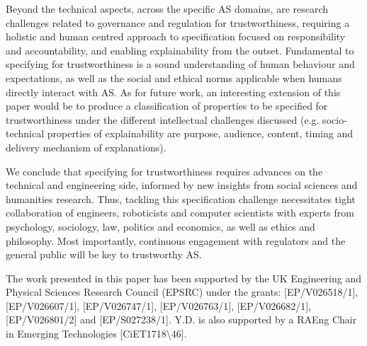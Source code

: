 \documentclass[sigconf,nonacm]{acmart}%
\begin{document}
	Beyond the technical aspects, across the specific AS domains, are research challenges related to governance and regulation for trustworthiness, requiring a holistic and human centred approach to specification focused on responsibility and accountability, and enabling explainability from the outset. 
	Fundamental to specifying for trustworthiness is a sound understanding of human behaviour and expectations, as well as the social and ethical norms applicable when humans directly interact with AS. 
	As for future work, an interesting extension of this paper would be to produce a classification of properties to be specified for trustworthiness under the different intellectual challenges discussed (e.g. socio-technical properties of explainability are purpose, audience, content, timing and delivery mechanism of explanations). 
	
	We conclude that specifying for trustworthiness requires advances on the technical and engineering side, informed by new insights from social sciences and humanities research. Thus, tackling this specification challenge necessitates tight collaboration of engineers, roboticists and computer scientists with experts from psychology, sociology, law, politics and economics, as well as ethics and philosophy. Most importantly, continuous engagement with regulators and the general public will be key to trustworthy AS.
	
	\begin{acks}
		The work presented in this paper has been supported by the UK Engineering and Physical Sciences Research Council (EPSRC) under the grants: [EP/V026518/1], [EP/V026607/1], [EP/V026747/1], [EP/V026763/1], [EP/V026682/1], [EP/V026801/2] and [EP/S027238/1]. Y.D. is also supported by a RAEng Chair in Emerging Technologies [CiET1718\textbackslash46].
	\end{acks}
	
	
	
\end{document}
